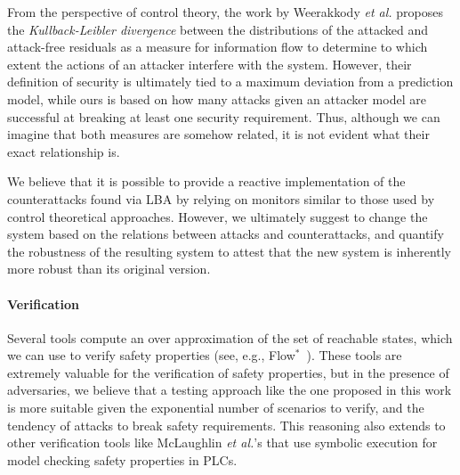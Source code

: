 {From the perspective of control theory, the work by Weerakkody \emph{et al.} \cite{IFCPSSec} proposes the \emph{Kullback-Leibler divergence} between the distributions of the attacked and attack-free residuals as {a measure for information flow} to determine to which extent the actions of an attacker interfere with the system. However, their definition of security is ultimately tied to a maximum deviation from a prediction model, while ours is based on how many attacks given an attacker model are successful at breaking at least one security requirement. Thus, although we can imagine that both measures are somehow related, it is not evident what their exact relationship is.

We believe that it is possible to provide a reactive implementation of the counterattacks found via LBA by relying on monitors similar to those used by control theoretical approaches. However, we ultimately suggest to change the system based on the relations between attacks and counterattacks, and quantify the robustness of the resulting system to attest that the new system is inherently more robust than its original version.
 

\paragraph{Verification}
Several tools compute an over approximation of the set of reachable states, which we can use to verify safety properties (see, e.g., Flow$^*$~\cite{FlowStar}). 
These tools are extremely valuable for the verification of safety properties, but in the presence of adversaries, we believe that a testing approach like the one proposed in this work is more suitable given the exponential number of scenarios to verify, and the tendency of attacks to break safety requirements. This reasoning also extends to other verification tools like McLaughlin \emph{et al.}'s \cite{TSVPLC} that use symbolic execution for model checking safety properties in PLCs.

{
}

}

